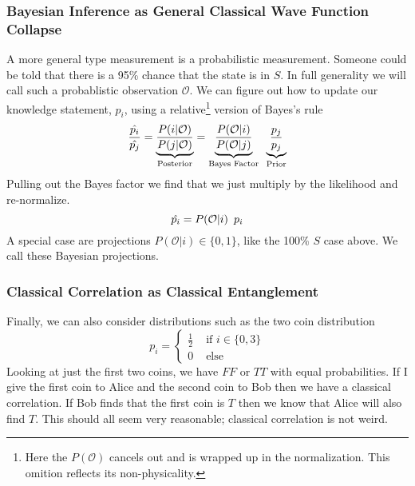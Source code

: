 \documentclass[12pt,a4paper]{article}
\begin{document}
\subsubsection{Bayesian Inference as General Classical Wave Function Collapse}
A more general type measurement is a probabilistic measurement.  Someone could be told that there is a 95\% chance that the state is in $S$.  In full generality we will call such a probablistic observation $\mathcal{O}$.  We can figure out how to update our knowledge statement, $p_i$, using a relative\footnote{Here the $P(\mathcal{O})$ cancels out and is wrapped up in the normalization. This omition reflects its non-physicality.} version of Bayes's rule
\[
  \frac{\hat{p_i}}{\hat{p_j}} = \underbrace{\frac{P(i | \mathcal{O})}{P(j | \mathcal{O})}}_\text{Posterior}
                              = \underbrace{\frac{P(\mathcal{O} | i)}{P(\mathcal{O}|j)}}_\text{Bayes Factor}  \hspace{0.07 in}  \underbrace{\frac{p_j}{p_j}}_\text{Prior}
\]
Pulling out the Bayes factor we find that we just multiply by the likelihood and re-normalize.
\[
  \hat{p_i} =  P(\mathcal{O} | i) \hspace{0.07 in} p_i
\]
A special case are projections $P(\mathcal{O} | i) \in \{0,1\}$, like the 100\% $S$ case above.  We call these Bayesian projections.

\subsubsection{Classical Correlation as Classical Entanglement}
Finally, we can also consider distributions such as the two coin distribution
\[
p_i = 
\left\{
\begin{split}
\frac{1}{2} & \mbox{ if } i \in \{0,3\}\\
0 &\mbox{ else }
\end{split}
\right.
\]
Looking at just the first two coins, we have $FF$ or $TT$ with equal probabilities.  If I give the first coin to Alice and the second coin to Bob then we have a classical correlation.  If Bob finds that the first coin is $T$ then we know that Alice will also find $T$.  This should all seem very reasonable; classical correlation is not weird.
\end{document}
